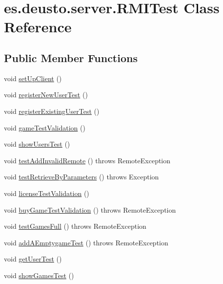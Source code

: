 \hypertarget{classes_1_1deusto_1_1server_1_1_r_m_i_test}{}\section{es.\+deusto.\+server.\+R\+M\+I\+Test Class Reference}
\label{classes_1_1deusto_1_1server_1_1_r_m_i_test}
\subsection*{Public Member Functions}
\begin{DoxyCompactItemize}
\item 
void \hyperlink{classes_1_1deusto_1_1server_1_1_r_m_i_test_ae18833c79a18cfde52e5e474d4dc9608}{set\+Up\+Client} ()
\item 
void \hyperlink{classes_1_1deusto_1_1server_1_1_r_m_i_test_a54c5099976b8a10b94d97e9ca5b56887}{register\+New\+User\+Test} ()
\item 
void \hyperlink{classes_1_1deusto_1_1server_1_1_r_m_i_test_a948b0198e31a685d6e1eb9c1e5627b34}{register\+Existing\+User\+Test} ()
\item 
void \hyperlink{classes_1_1deusto_1_1server_1_1_r_m_i_test_a75cd40a6006bfc550385da05b91834d1}{game\+Test\+Validation} ()
\item 
void \hyperlink{classes_1_1deusto_1_1server_1_1_r_m_i_test_ad005b60d2f70a07f8844548e4ba47eb5}{show\+Users\+Test} ()
\item 
void \hyperlink{classes_1_1deusto_1_1server_1_1_r_m_i_test_a1cd3656994a308534ce8ab01909c8ebf}{test\+Add\+Invalid\+Remote} ()  throws Remote\+Exception 
\item 
void \hyperlink{classes_1_1deusto_1_1server_1_1_r_m_i_test_ad003df1db33c457541376488626208cc}{test\+Retrieve\+By\+Parameters} ()  throws Exception  
\item 
void \hyperlink{classes_1_1deusto_1_1server_1_1_r_m_i_test_afb9dcc7e143d07d6254d052d8c5b7eeb}{license\+Test\+Validation} ()
\item 
void \hyperlink{classes_1_1deusto_1_1server_1_1_r_m_i_test_a2af4f64232d4c4ce2e0fcfe788ae7c72}{buy\+Game\+Test\+Validation} ()  throws Remote\+Exception 
\item 
void \hyperlink{classes_1_1deusto_1_1server_1_1_r_m_i_test_a36131d385518bf235184ccf288d6e126}{test\+Games\+Full} ()  throws Remote\+Exception 
\item 
void \hyperlink{classes_1_1deusto_1_1server_1_1_r_m_i_test_ae30d264c095cf976eded0973af19cffe}{add\+A\+Emptygame\+Test} ()  throws Remote\+Exception 	
\item 
void \hyperlink{classes_1_1deusto_1_1server_1_1_r_m_i_test_a6cf336e0c15c62f0d1f5a9dc912729b4}{get\+User\+Test} ()
\item 
void \hyperlink{classes_1_1deusto_1_1server_1_1_r_m_i_test_a76399e428da2d0c00c4047069cd052c1}{show\+Games\+Test} ()
\end{DoxyCompactItemize}
